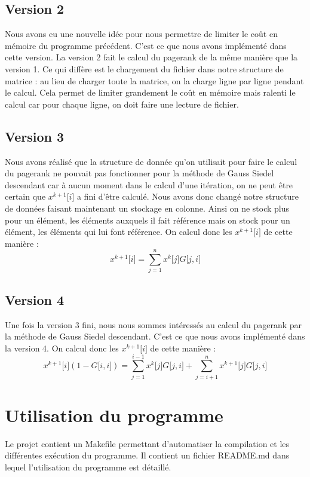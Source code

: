 \documentclass[10pt,a4paper]{article}
\begin{document}
\subsection{Version 2}
Nous avons eu une nouvelle idée pour nous permettre de limiter le coût en mémoire du programme précédent. C'est ce que nous avons implémenté dans cette version. La version 2 fait le calcul du pagerank de la même manière que la version 1. Ce qui diffère est le chargement du fichier dans notre structure de matrice : au lieu de charger toute la matrice, on la charge ligne par ligne pendant le calcul. Cela permet de limiter grandement le coût en mémoire mais ralenti le calcul car pour chaque ligne, on doit faire une lecture de fichier.

\subsection{Version 3}
Nous avons réalisé que la structure de donnée qu'on utilisait pour faire le calcul du pagerank ne pouvait pas fonctionner pour la méthode de Gauss Siedel descendant car à aucun moment dans le calcul d'une itération, on ne peut être certain que $x^{k+1} \lbrack i \rbrack$ a fini d'être calculé. Nous avons donc changé notre structure de données faisant maintenant un stockage en colonne. Ainsi on ne stock plus pour un élément, les éléments auxquels il fait référence mais on stock pour un élément, les éléments qui lui font référence. On calcul donc les $x^{k+1} \lbrack i \rbrack$ de cette manière :
\[x^{k+1} \lbrack i \rbrack = \sum_{j=1}^{n} x^{k} \lbrack j \rbrack G\lbrack j,i \rbrack\]

\subsection{Version 4}
Une fois la version 3 fini, nous nous sommes intéressés au calcul du pagerank par la méthode de Gauss Siedel descendant. C'est ce que nous avons implémenté dans la version 4. On calcul donc les $x^{k+1} \lbrack i \rbrack$ de cette manière :
\[x^{k+1} \lbrack i \rbrack (1 - G \lbrack i, i \rbrack) = \sum_{j=1}^{i-1} x^{k} \lbrack j \rbrack G\lbrack j,i \rbrack + \sum_{j=i+1}^{n} x^{k+1} \lbrack j \rbrack G\lbrack j,i \rbrack\]

\section{Utilisation du programme}
Le projet contient un Makefile permettant d'automatiser la compilation et les différentes exécution du programme. Il contient un fichier README.md dans lequel l'utilisation du programme est détaillé.
\end{document}
